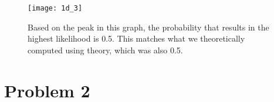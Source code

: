 \documentclass[11pt]{article}
\begin{document}
\begin{enumerate}
             
            \begin{figure}[h]
                \centering
                \texttt{[image: 1d\_3]}
                \caption{Based on the peak in this graph, the probability that results in the highest likelihood is 0.5. This matches what we theoretically computed using theory, which was also 0.5.}
            \end{figure}
        
        
        \vfill
        \clearpage
    
    \end{enumerate}

\newpage
\section{Problem 2}
\end{document}
